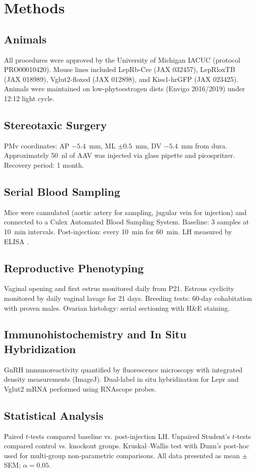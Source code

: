 \documentclass[11pt]{article}
\begin{document}
\section{Methods}

\subsection{Animals}
All procedures were approved by the University of Michigan IACUC (protocol PRO00010420). Mouse lines included LepRb-Cre (JAX 032457), LepRloxTB (JAX 018989), Vglut2-floxed (JAX 012898), and Kiss1-hrGFP (JAX 023425). Animals were maintained on low-phytoestrogen diets (Envigo 2016/2019) under 12:12 light cycle.

\subsection{Stereotaxic Surgery}
PMv coordinates: AP $-5.4$~mm, ML $\pm 0.5$~mm, DV $-5.4$~mm from dura. Approximately 50~nl of AAV was injected via glass pipette and picospritzer. Recovery period: 1 month.

\subsection{Serial Blood Sampling}
Mice were cannulated (aortic artery for sampling, jugular vein for injection) and connected to a Culex Automated Blood Sampling System. Baseline: 3 samples at 10~min intervals. Post-injection: every 10~min for 60~min. LH measured by ELISA \citep{steyn2013development}.

\subsection{Reproductive Phenotyping}
Vaginal opening and first estrus monitored daily from P21. Estrous cyclicity monitored by daily vaginal lavage for 21 days. Breeding tests: 60-day cohabitation with proven males. Ovarian histology: serial sectioning with H\&E staining.

\subsection{Immunohistochemistry and In Situ Hybridization}
GnRH immunoreactivity quantified by fluorescence microscopy with integrated density measurements (ImageJ). Dual-label in situ hybridization for Lepr and Vglut2 mRNA performed using RNAscope probes.

\subsection{Statistical Analysis}
Paired $t$-tests compared baseline vs. post-injection LH. Unpaired Student's $t$-tests compared control vs. knockout groups. Kruskal--Wallis test with Dunn's post-hoc used for multi-group non-parametric comparisons. All data presented as mean $\pm$ SEM; $\alpha = 0.05$.
\end{document}
